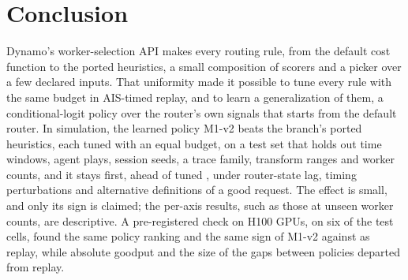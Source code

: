 %

\section{Conclusion}
\label{sec:conclusion}

Dynamo's worker-selection API makes every routing rule, from the default cost function to the ported
heuristics, a small composition of scorers and a picker over a few declared inputs. That uniformity
made it possible to tune every rule with the same budget in AIS-timed replay, and to learn a
generalization of them, a conditional-logit policy over the router's own signals that starts from the
default router. In simulation, the learned policy M1-v2 beats the branch's ported heuristics, each
tuned with an equal budget, on a test set that holds out time windows, agent plays, session seeds, a
trace family, transform ranges and worker counts, and it stays first, ahead of tuned
, under router-state lag, timing perturbations and alternative definitions of a good
request. The effect is small, and only its sign is claimed; the per-axis results, such as those at
unseen worker counts, are descriptive. A pre-registered check on H100 GPUs, on six of the test cells,
found the same policy ranking and the same sign of M1-v2 against  as replay, while
absolute goodput and the size of the gaps between policies departed from replay.

